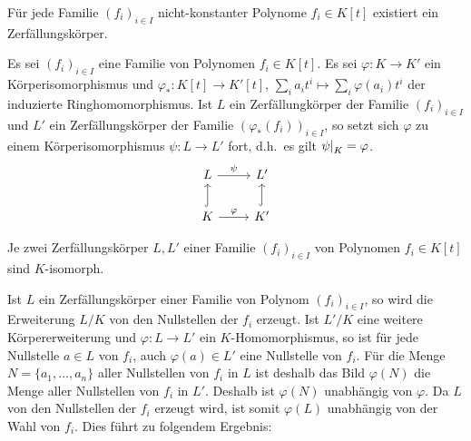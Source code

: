 \begin{lemma}
  Für jede Familie $(f_i)_{i \in I}$ nicht-konstanter Polynome $f_i \in K[t]$ existiert ein Zerfällungskörper.
\end{lemma}

\begin{lemma}
  Es sei $(f_i)_{i \in I}$ eine Familie von Polynomen $f_i \in K[t]$.
  Es sei $\varphi \colon K \to K'$ ein Körperisomorphismus und $\varphi_* \colon K[t] \to K'[t]$, $\sum_i a_i t^i \mapsto \sum_i \varphi(a_i) t^i$ der induzierte Ringhomomorphismus.
  Ist $L$ ein Zerfällungkörper der Familie $(f_i)_{i \in I}$ und $L'$ ein Zerfällungskörper der Familie $(\varphi_*(f_i))_{i \in I}$, so setzt sich $\varphi$ zu einem Körperisomorphismus $\psi \colon L \to L'$ fort, d.h.\ es gilt $\restrict{\psi}{K} = \varphi$.
  \[
    \begin{tikzcd}
      L
        \arrow{r}[above]{\psi}
      & L'
      \\
        K
        \arrow[hook]{u}
        \arrow{r}[above]{\varphi}
      & K'
        \arrow[hook]{u}
    \end{tikzcd}
  \]
\end{lemma}

\begin{corollary}
  Je zwei Zerfällungskörper $L, L'$ einer Familie $(f_i)_{i \in I}$ von Polynomen $f_i \in K[t]$ sind $K$-isomorph.
\end{corollary}

Ist $L$ ein Zerfällungskörper einer Familie von Polynom $(f_i)_{i \in I}$, so wird die Erweiterung $L/K$ von den Nullstellen der $f_i$ erzeugt.
Ist $L'/K$ eine weitere Körpererweiterung und $\varphi \colon L \to L'$ ein $K$-Homomorphismus, so ist für jede Nullstelle $a \in L$ von $f_i$, auch $\varphi(a) \in L'$ eine Nullstelle von $f_i$.
Für die Menge $N = \{ a_1, \dotsc, a_n \}$ aller Nullstellen von $f_i$ in $L$ ist deshalb das Bild $\varphi(N)$ die Menge aller Nullstellen von $f_i$ in $L'$.
Deshalb ist $\varphi(N)$ unabhängig von $\varphi$.
Da $L$ von den Nullstellen der $f_i$ erzeugt wird, ist somit $\varphi(L)$ unabhängig von der Wahl von $f_i$.
Dies führt zu folgendem Ergebnis:


